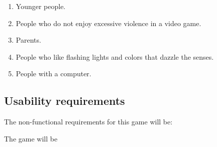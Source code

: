 \begin{multicols}{2}
\begin{enumerate}
  \item Younger people.

  \item People who do not enjoy excessive violence in a video game.

  \item Parents.

  \item People who like flashing lights and colors that dazzle the senses.

  \item People with a computer.

\end{enumerate}
\end{multicols}

\subsection{Usability requirements}

The non-functional requirements for this game will be:

\vspace{4mm}
The game will be

